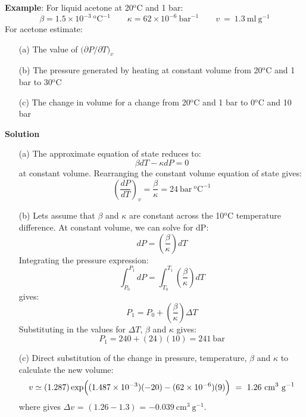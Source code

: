 \documentclass[11pt]{article}
\theoremstyle{definition}
\begin{document}
\begin{mdframed}[backgroundcolor=lgray]
  \noindent\textbf{Example}: For liquid acetone at 20$^{\mathrm{o}}$C and 1 bar:
  \begin{equation*}
    \beta = 1.5\times10^{-3}~^{\mathrm{o}}\mathrm{C}^{\mathrm{-1}}\qquad\kappa=62\times10^{-6}~\mathrm{bar}^{-1}\qquad v~=~1.3~\mathrm{ml~g^{-1}}
  \end{equation*}
  For acetone estimate:
  \begin{enumerate}
    \item[(a)]{The value of $\Bigr(\partial{P}/\partial{T}\Bigr)_{v}$}
    \item[(b)]{The pressure generated by heating at constant volume from 20$^{\mathrm{o}}$C and 1 bar to 30$^{\mathrm{o}}$C}
    \item[(c)]{The change in volume for a change from 20$^{\mathrm{o}}$C and 1 bar to 0$^{\mathrm{o}}$C and 10 bar}
  \end{enumerate}
	\noindent\textbf{Solution}
	\begin{enumerate}
		\item[(a)]{The approximate equation of state reduces to:
		\begin{equation}
			\beta dT -\kappa dP = 0
		\end{equation}
		at constant volume. Rearranging the constant volume equation of state gives:
		\begin{equation}
			\left(\frac{dP}{dT}\right)_{v} = \frac{\beta}{\kappa} = 24~\mathrm{bar~^{o}C^{-1}}
		\end{equation}
		}
		\item[(b)]{Lets assume that $\beta$ and $\kappa$ are constant across the 10$^{\mathrm{o}}$C temperature difference.
		At constant volume, we can solve for dP:
		\begin{equation}
			dP = \left(\frac{\beta}{\kappa}\right)dT
		\end{equation}Integrating the pressure expression:
		\begin{equation}
			\int_{P_{0}}^{P_{1}}dP = \int_{T_{0}}^{T_{1}}\left(\frac{\beta}{\kappa}\right)dT
		\end{equation}gives:
		\begin{equation}
			P_{1} = P_{0}+\left(\frac{\beta}{\kappa}\right)\Delta{T}
		\end{equation}Substituting in the values for $\Delta{T}$, $\beta$ and $\kappa$ gives:
		\begin{equation}
			P_{1} = 240 + (24)(10) = 241~\mathrm{bar}
		\end{equation}
		}
		\item[(c)]{Direct substitution of the change in pressure, temperature, $\beta$ and $\kappa$ to calculate the new volume:
		\begin{equation}
			v\simeq(1.287)\exp\Bigl((1.487\times10^{-3})(-20)-(62\times10^{-6})(9)\Bigr)~=~1.26~\mathrm{cm^{3}~g^{-1}}
		\end{equation}where gives $\Delta{v}$ = $(1.26 - 1.3)$ = $-0.039~\mathrm{cm^{3}~g^{-1}}$.
		}
	\end{enumerate}

\end{mdframed}
\end{document}
